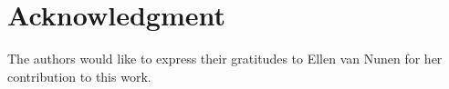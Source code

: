 \documentclass[letterpaper, 10 pt, conference]{ieeeconf}  %
\begin{document}
\section*{Acknowledgment}

The authors would like to express their gratitudes to Ellen van Nunen for her contribution to this work. 


\printbibliography

%
%
\end{document}
